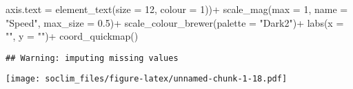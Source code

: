 \documentclass[
]{article}
\newenvironment{Shaded}{\begin{snugshade}}{\end{snugshade}}
\newcommand{\AttributeTok}[1]{\textcolor[rgb]{0.77,0.63,0.00}{#1}}
\newcommand{\DecValTok}[1]{\textcolor[rgb]{0.00,0.00,0.81}{#1}}
\newcommand{\FloatTok}[1]{\textcolor[rgb]{0.00,0.00,0.81}{#1}}
\newcommand{\FunctionTok}[1]{\textcolor[rgb]{0.00,0.00,0.00}{#1}}
\newcommand{\NormalTok}[1]{#1}
\newcommand{\SpecialCharTok}[1]{\textcolor[rgb]{0.00,0.00,0.00}{#1}}
\newcommand{\StringTok}[1]{\textcolor[rgb]{0.31,0.60,0.02}{#1}}
\begin{document}
\begin{Shaded}
\begin{Highlighting}[]
        \AttributeTok{axis.text =} \FunctionTok{element\_text}\NormalTok{(}\AttributeTok{size =} \DecValTok{12}\NormalTok{, }\AttributeTok{colour =} \DecValTok{1}\NormalTok{))}\SpecialCharTok{+}
  \FunctionTok{scale\_mag}\NormalTok{(}\AttributeTok{max =} \DecValTok{1}\NormalTok{, }\AttributeTok{name =} \StringTok{"Speed"}\NormalTok{, }\AttributeTok{max\_size =} \FloatTok{0.5}\NormalTok{)}\SpecialCharTok{+}
  \FunctionTok{scale\_colour\_brewer}\NormalTok{(}\AttributeTok{palette =} \StringTok{"Dark2"}\NormalTok{)}\SpecialCharTok{+}
  \FunctionTok{labs}\NormalTok{(}\AttributeTok{x =} \StringTok{""}\NormalTok{, }\AttributeTok{y =} \StringTok{""}\NormalTok{)}\SpecialCharTok{+}
  \FunctionTok{coord\_quickmap}\NormalTok{()}
\end{Highlighting}
\end{Shaded}

\begin{verbatim}
## Warning: imputing missing values
\end{verbatim}

\texttt{[image: soclim\_files/figure-latex/unnamed-chunk-1-18.pdf]}
\end{document}
